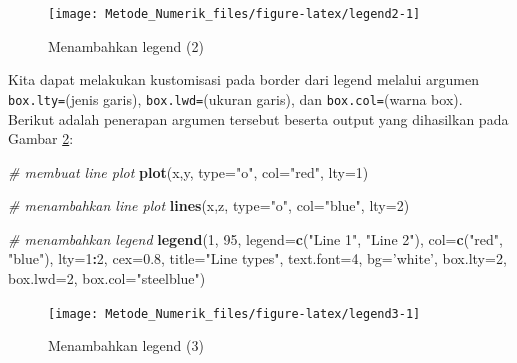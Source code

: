 \documentclass[]{book}
\newenvironment{Shaded}{\begin{snugshade}}{\end{snugshade}}
\newcommand{\CommentTok}[1]{\textcolor[rgb]{0.56,0.35,0.01}{\textit{#1}}}
\newcommand{\DataTypeTok}[1]{\textcolor[rgb]{0.13,0.29,0.53}{#1}}
\newcommand{\DecValTok}[1]{\textcolor[rgb]{0.00,0.00,0.81}{#1}}
\newcommand{\FloatTok}[1]{\textcolor[rgb]{0.00,0.00,0.81}{#1}}
\newcommand{\KeywordTok}[1]{\textcolor[rgb]{0.13,0.29,0.53}{\textbf{#1}}}
\newcommand{\NormalTok}[1]{#1}
\newcommand{\OperatorTok}[1]{\textcolor[rgb]{0.81,0.36,0.00}{\textbf{#1}}}
\newcommand{\StringTok}[1]{\textcolor[rgb]{0.31,0.60,0.02}{#1}}
\theoremstyle{definition}
\theoremstyle{definition}
\theoremstyle{definition}
\theoremstyle{remark}
\begin{document}
\begin{figure}

{\centering \texttt{[image: Metode\_Numerik\_files/figure-latex/legend2-1]} 

}

\caption{Menambahkan legend (2)}\label{fig:legend2}
\end{figure}

Kita dapat melakukan kustomisasi pada border dari legend melalui argumen \texttt{box.lty=}(jenis garis), \texttt{box.lwd=}(ukuran garis), dan \texttt{box.col=}(warna box). Berikut adalah penerapan argumen tersebut beserta output yang dihasilkan pada Gambar \ref{fig:legend3}:

\begin{Shaded}
\begin{Highlighting}[]
\CommentTok{# membuat line plot}
\KeywordTok{plot}\NormalTok{(x,y, }\DataTypeTok{type=}\StringTok{"o"}\NormalTok{, }\DataTypeTok{col=}\StringTok{"red"}\NormalTok{, }\DataTypeTok{lty=}\DecValTok{1}\NormalTok{)}

\CommentTok{# menambahkan line plot}
\KeywordTok{lines}\NormalTok{(x,z, }\DataTypeTok{type=}\StringTok{"o"}\NormalTok{, }\DataTypeTok{col=}\StringTok{"blue"}\NormalTok{, }\DataTypeTok{lty=}\DecValTok{2}\NormalTok{)}

\CommentTok{# menambahkan legend}
\KeywordTok{legend}\NormalTok{(}\DecValTok{1}\NormalTok{, }\DecValTok{95}\NormalTok{, }\DataTypeTok{legend=}\KeywordTok{c}\NormalTok{(}\StringTok{"Line 1"}\NormalTok{, }\StringTok{"Line 2"}\NormalTok{),}
       \DataTypeTok{col=}\KeywordTok{c}\NormalTok{(}\StringTok{"red"}\NormalTok{, }\StringTok{"blue"}\NormalTok{), }\DataTypeTok{lty=}\DecValTok{1}\OperatorTok{:}\DecValTok{2}\NormalTok{, }\DataTypeTok{cex=}\FloatTok{0.8}\NormalTok{,}
       \DataTypeTok{title=}\StringTok{"Line types"}\NormalTok{, }\DataTypeTok{text.font=}\DecValTok{4}\NormalTok{, }\DataTypeTok{bg=}\StringTok{'white'}\NormalTok{,}
       \DataTypeTok{box.lty=}\DecValTok{2}\NormalTok{, }\DataTypeTok{box.lwd=}\DecValTok{2}\NormalTok{, }\DataTypeTok{box.col=}\StringTok{"steelblue"}\NormalTok{)}
\end{Highlighting}
\end{Shaded}

\begin{figure}

{\centering \texttt{[image: Metode\_Numerik\_files/figure-latex/legend3-1]} 

}

\caption{Menambahkan legend (3)}\label{fig:legend3}
\end{figure}
\end{document}
